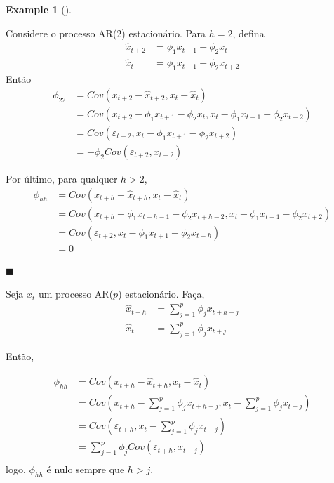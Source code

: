 \documentclass[
  letterpaper,
  DIV=11,
  numbers=noendperiod]{scrartcl}
\theoremstyle{plain}
\theoremstyle{plain}
\theoremstyle{definition}
\newtheorem{example}{Example}[chapter]
\theoremstyle{definition}
\theoremstyle{remark}
\begin{document}
\begin{example}[]\protect\hypertarget{exm-}{}\label{exm-}

Considere o processo AR(2) estacionário. Para \(h=2\), defina
\[\begin{align}\hat{x}_{t+2}&=\phi_1 x_{t+1}+\phi_2 x_{t}\\ \hat{x}_t&=\phi_1 x_{t+1}+\phi_2 x_{t+2}\end{align}\]
Então
\[\begin{align}\phi_{22}&=Cov(x_{t+2}-\hat{x}_{t+2}, x_t-\hat{x}_t)\\&=Cov(x_{t+2}-\phi_1 x_{t+1}-\phi_2 x_{t},x_t-\phi_1 x_{t+1}-\phi_2 x_{t+2})\\
&=Cov(\varepsilon_{t+2},x_t-\phi_1 x_{t+1} - \phi_2 x_{t+2})\\&=-\phi_2Cov(\varepsilon_{t+2},x_{t+2})\end{align}\]

Por último, para qualquer \(h>2\),
\[\begin{align}\phi_{hh}&=Cov(x_{t+h}-\hat{x}_{t+h}, x_t-\hat{x}_t)\\&=Cov(x_{t+h}-\phi_1 x_{t+h-1}-\phi_2 x_{t+h-2},x_t-\phi_1 x_{t+1}-\phi_2 x_{t+2})\\
&=Cov(\varepsilon_{t+2},x_t-\phi_1 x_{t+1} - \phi_2 x_{t+h})\\&=0\end{align}\]

\(\blacksquare\)

\end{example}

Seja \(x_t\) um processo AR(\(p\)) estacionário. Faça,
\[\begin{align}\hat{x}_{t+h}&=\sum_{j=1}^p \phi_j x_{t+h-j}\\ \hat{x}_t&=\sum_{j=1}^p \phi_j x_{t+j}\end{align}\]

Então,

\[\begin{align}\phi_{hh}&=Cov(x_{t+h}-\hat{x}_{t+h},x_t-\hat{x}_{t})\\
&=Cov\left(x_{t+h}-\sum_{j=1}^p\phi_j x_{t+h-j},x_{t}-\sum_{j=1}^p\phi_j x_{t-j} \right)\\
&=Cov\left(\varepsilon_{t+h},x_{t}-\sum_{j=1}^p\phi_j x_{t-j} \right)\\ &=\sum_{j=1}^p \phi_j Cov\left(\varepsilon_{t+h}, x_{t-j} \right)\\ \end{align}\]
logo, \(\phi_{hh}\) é nulo sempre que \(h>j\).
\end{document}
